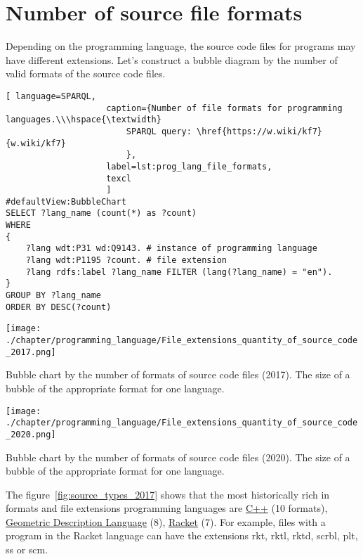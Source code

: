 \section{Number of source file formats}
Depending on the programming language, the source code files for programs may have different extensions. Let's construct a bubble diagram by the number of valid formats of the source code files.
\begin{lstlisting}[ language=SPARQL, 
                    caption={Number of file formats for programming languages.\\\hspace{\textwidth}
                        SPARQL query: \href{https://w.wiki/kf7}{w.wiki/kf7}
                        },
                    label=lst:prog_lang_file_formats,
                    texcl 
                    ]
#defaultView:BubbleChart
SELECT ?lang_name (count(*) as ?count)
WHERE
{
	?lang wdt:P31 wd:Q9143. # instance of programming language
	?lang wdt:P1195 ?count. # file extension
	?lang rdfs:label ?lang_name FILTER (lang(?lang_name) = "en").
}
GROUP BY ?lang_name 
ORDER BY DESC(?count)
\end{lstlisting}%

\begin{marginfigure}[-15cm]
	\texttt{[image: ./chapter/programming\_language/File\_extensions\_quantity\_of\_source\_code\_2017.png]}
	\caption{Bubble chart by the number of formats of source code files (2017). The size of a bubble of the appropriate format for one language.}
	\label{fig:source_types_2017}
\end{marginfigure}
\begin{marginfigure}[-3cm]
	\texttt{[image: ./chapter/programming\_language/File\_extensions\_quantity\_of\_source\_code\_2020.png]}
	\caption{Bubble chart by the number of formats of source code files (2020). The size of a bubble of the appropriate format for one language.}
	\label{fig:source_types_2020}
\end{marginfigure}

The figure~\ref{fig:source_types_2017} shows that the most historically rich in formats and file extensions programming languages are \href{https://en.wikipedia.org/wiki/C\%2B\%2B}{C++} (10 formats), \href{https://en.wikipedia.org/wiki/Geometric_Description_Language}{Geometric Description Language} (8), \href{https://en.wikipedia.org/wiki/Racket}{Racket} (7). For example, files with a program in the Racket language can have the extensions rkt, rktl, rktd, scrbl, plt, ss or scm.


